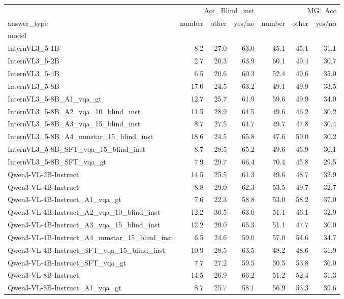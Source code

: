 \begin{tabular}{lrrrrrr}
\toprule
 & \multicolumn{3}{r}{Acc_Blind_inst} & \multicolumn{3}{r}{MG_Acc} \\
answer_type & number & other & yes/no & number & other & yes/no \\
model &  &  &  &  &  &  \\
\midrule
InternVL3_5-1B & 8.2 & 27.0 & 63.0 & 45.1 & 45.1 & 31.1 \\
InternVL3_5-2B & 2.7 & 20.3 & 63.9 & 60.1 & 49.4 & 30.7 \\
InternVL3_5-4B & 6.5 & 20.6 & 60.3 & 52.4 & 49.6 & 35.0 \\
InternVL3_5-8B & 17.0 & 24.5 & 63.2 & 49.1 & 49.9 & 33.5 \\
InternVL3_5-8B_A1_vqa_gt & 12.7 & 25.7 & 61.9 & 59.6 & 49.9 & 34.0 \\
InternVL3_5-8B_A2_vqa_10_blind_inst & 11.5 & 28.9 & 64.5 & 49.6 & 46.2 & 30.2 \\
InternVL3_5-8B_A3_vqa_15_blind_inst & 8.7 & 27.5 & 64.7 & 49.7 & 47.8 & 30.4 \\
InternVL3_5-8B_A4_mmstar_15_blind_inst & 18.6 & 24.5 & 65.8 & 47.6 & 50.0 & 30.2 \\
InternVL3_5-8B_SFT_vqa_15_blind_inst & 8.7 & 28.5 & 65.2 & 49.6 & 46.9 & 30.1 \\
InternVL3_5-8B_SFT_vqa_gt & 7.9 & 29.7 & 66.4 & 70.4 & 45.8 & 29.5 \\
Qwen3-VL-2B-Instruct & 14.5 & 25.5 & 61.3 & 49.6 & 48.7 & 32.9 \\
Qwen3-VL-4B-Instruct & 8.8 & 29.0 & 62.3 & 53.5 & 49.7 & 32.7 \\
Qwen3-VL-4B-Instruct_A1_vqa_gt & 7.6 & 22.3 & 58.8 & 53.0 & 58.2 & 37.0 \\
Qwen3-VL-4B-Instruct_A2_vqa_10_blind_inst & 12.2 & 30.5 & 63.0 & 51.1 & 46.1 & 32.9 \\
Qwen3-VL-4B-Instruct_A3_vqa_15_blind_inst & 12.2 & 29.0 & 65.3 & 51.1 & 47.7 & 30.0 \\
Qwen3-VL-4B-Instruct_A4_mmstar_15_blind_inst & 6.5 & 24.6 & 59.0 & 57.0 & 54.6 & 34.7 \\
Qwen3-VL-4B-Instruct_SFT_vqa_15_blind_inst & 10.9 & 28.5 & 63.5 & 48.2 & 48.6 & 31.9 \\
Qwen3-VL-4B-Instruct_SFT_vqa_gt & 7.7 & 27.2 & 59.5 & 50.5 & 53.8 & 36.0 \\
Qwen3-VL-8B-Instruct & 14.5 & 26.9 & 66.2 & 51.2 & 52.4 & 31.3 \\
Qwen3-VL-8B-Instruct_A1_vqa_gt & 8.7 & 25.7 & 58.1 & 56.9 & 53.3 & 39.6 \\

\end{tabular}
